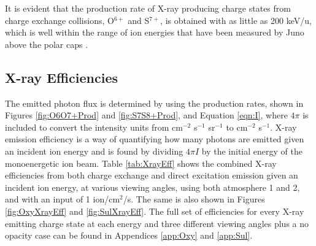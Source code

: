 \documentclass[draft]{agujournal2018}
\begin{document}
It is evident that the production rate of X-ray producing charge states from charge exchange collisions, O$^{6+}$ and S$^{7+}$, is obtained with as little as 200 keV/u, which is well within the range of ion energies that have been measured by Juno above the polar caps \citep{haggerty2017,clark2017a,clark2017b}.


\subsection{X-ray Efficiencies}

The emitted photon flux is determined by using the production rates, shown in Figures \ref{fig:O6O7+Prod} and \ref{fig:S7S8+Prod}, and Equation \ref{eqn:I}, where $4\pi$ is included to convert the intensity units from cm$^{-2}$ s$^{-1}$ sr$^{-1}$ to cm$^{-2}$ s$^{-1}$.
X-ray emission efficiency is a way of quantifying how many photons are emitted given an incident ion energy and is found by dividing $4\pi I$ by the initial energy of the monoenergetic ion beam.
Table \ref{tab:XrayEff} shows the combined X-ray efficiencies from both charge exchange and direct excitation emission given an incident ion energy, at various viewing angles, using both atmosphere 1 and 2, and with an input of 1 ion/cm$^2$/s.
The same is also shown in Figures \ref{fig:OxyXrayEff} and \ref{fig:SulXrayEff}.
The full set of efficiencies for every X-ray emitting charge state at each energy and three different viewing angles plus a no opacity case can be found in Appendices \ref{app:Oxy} and \ref{app:Sul}.
\end{document}
